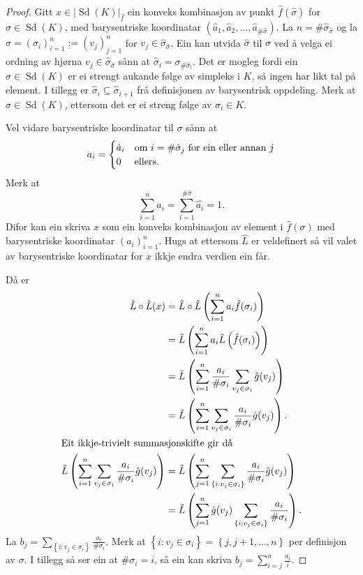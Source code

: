 \documentclass[a4paper, 12pt, norsk]{article}
\theoremstyle{plain}
\theoremstyle{definition}
\newcommand{\gr}[1]{ \lvert #1 \rvert } %
\newcommand{\set}[1]{ \left\{ #1 \right\} } %
\newcommand{\tuple}[1]{ \left( #1 \right) } %
\DeclareMathOperator{\Sd}{Sd} %
\begin{document}
\begin{proof}
	Gitt \( x \in \gr{\Sd(K)}_{\hat{f}} \) ein konveks kombinasjon av punkt \( \hat{f}(\hat{\sigma}) \) for \( \hat{\sigma} \in \Sd(K) \), med barysentriske koordinatar \( \tuple{\hat{a}_1, \hat{a}_2, \dots, \hat{a}_{\#\hat{\sigma}}} \). La \( n = \#\hat{\sigma}_{\hat{\sigma}} \) og la \( \sigma = \tuple{\sigma_i}_{i=1}^{n} := \tuple{v_j}_{j=1}^{n} \) for \( v_j \in \hat{\sigma}_{\hat{\sigma}} \). Ein kan utvida \( \hat{\sigma} \) til \( \sigma \) ved å velga ei ordning av hjørna \( v_j \in \hat{\sigma}_{\hat{\sigma}} \) sånn at \( \hat{\sigma}_i = \sigma_{\#\hat{\sigma}_i} \). Det er mogleg fordi ein \( \hat{\sigma} \in \Sd(K) \) er ei strengt aukande følge av simpleks i \( K \), så ingen har likt tal på element. I tillegg er \( \hat{\sigma}_i \subseteq \hat{\sigma}_{i+1} \) frå definisjonen av barysentrisk oppdeling. Merk at \( \sigma \in \Sd(K) \), ettersom det er ei streng følge av \( \sigma_i \in K \).

	Vel vidare barysentriske koordinatar til \( \sigma \) sånn at
	\[
		a_i =
		\begin{cases}
			\hat{a}_i & \text{om \( i = \#\hat{\sigma}_j \) for ein eller annan \( j \)} \\
			0 & \text{ellers}.
		\end{cases}
	\]
	Merk at
	\[
		\sum_{i=1}^n a_i = \sum_{i=1}^{\#\hat{\sigma}}\hat{a_i}=1.
	\]
	Difor kan ein skriva \( x \) som ein konveks kombinasjon av element i \( \hat{f}(\sigma) \) med barysentriske koordinatar \( \tuple{a_i}_{i=1}^n \). Hugs at ettersom \( \hat{L} \) er veldefinert så vil valet av barysentriske koordinatar for \( x \) ikkje endra verdien ein får.

	Då er
	\begin{align*}
		\tilde{L}\circ\hat{L}(x) &= \tilde{L}\circ\hat{L}\tuple{\sum_{i=1}^n a_i \hat{f}(\sigma_i)} \\
		&= \tilde{L}\tuple{\sum_{i=1}^n a_i \hat{L}\tuple{\hat{f}(\sigma_i)}} \\
		&= \tilde{L}\tuple{\sum_{i=1}^n \frac{a_i}{\#\sigma_i}\sum_{v_j \in \sigma_i}\hat{g}(v_j)} \\
		&= \tilde{L}\tuple{\sum_{i=1}^n\sum_{v_j \in \sigma_i}\frac{a_i}{\#\sigma_i}\hat{g}(v_j)}. \\
		\intertext{Eit ikkje-trivielt summasjonskifte gir då}
		\tilde{L}\tuple{\sum_{i=1}^n\sum_{v_j \in \sigma_i}\frac{a_i}{\#\sigma_i}\hat{g}(v_j)} &= \tilde{L}\tuple{\sum_{j=1}^n\sum_{\set{i:v_j\in\sigma_i}}\frac{a_i}{\#\sigma_i}\hat{g}(v_j)} \\
		&= \tilde{L}\tuple{\sum_{j=1}^n \hat{g}(v_j) \sum_{\set{i:v_j\in\sigma_i}}\frac{a_i}{\#\sigma_i}}.
	\end{align*}
	La \( b_j = \sum_{\set{i:v_j\in\sigma_i}}\frac{a_i}{\#\sigma_i} \). Merk at \( \set{i : v_j \in \sigma_i} = \set{j, j+1, \dots, n } \) per definisjon av \( \sigma \). I tillegg så ser ein at \( \#\sigma_i = i \), så ein kan skriva \( b_j = \sum_{i=j}^n \frac{a_i}{i} \).


\end{proof}
\end{document}
